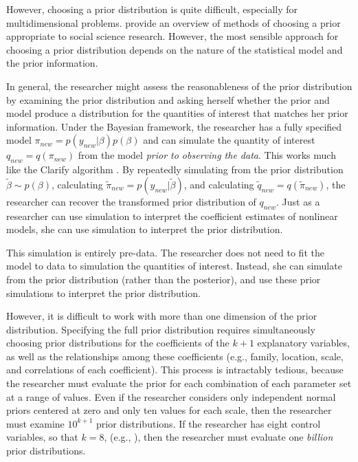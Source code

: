 \documentclass[12pt]{article}
\begin{document}
However, choosing a prior distribution is quite difficult, especially for multidimensional problems. 
\cite{GillWalker2005} provide an overview of methods of choosing a prior appropriate to social science research. 
However, the most sensible approach for choosing a prior distribution depends on the nature of the statistical model and the prior information.

In general, the researcher might assess the reasonableness of the prior distribution by examining the prior distribution and asking herself whether the prior and model produce a distribution for the quantities of interest that matches her prior information. 
Under the Bayesian framework, the researcher has a fully specified model $\pi_{new} = p(y_{new}|\beta)p(\beta)$ and can simulate the quantity of interest $q_{new} = q(\pi_{new})$ from the model \textit{prior to observing the data}. 
This works much like the Clarify algorithm \citep{KingTomzWittenberg2000}.
By repeatedly simulating from the prior distribution $\tilde{\beta} \sim p(\beta)$, calculating $\tilde{\pi}_{new} = p(y_{new}|\tilde{\beta})$, and calculating $\tilde{q}_{new} = q(\tilde{\pi}_{new})$, the researcher can recover the transformed prior distribution of $q_{new}$.
Just as a researcher can use simulation to interpret the coefficient estimates of nonlinear models, she can use simulation to interpret the prior distribution.

This simulation is entirely pre-data. 
The researcher does not need to fit the model to data to simulation the quantities of interest. 
Instead, she can simulate from the prior distribution (rather than the posterior), and use these prior simulations to interpret the prior distribution.

However, it is difficult to work with more than one dimension of the prior distribution. 
Specifying the full prior distribution requires simultaneously choosing prior distributions for the coefficients of the $k + 1$ explanatory variables, as well as the relationships among these coefficients (e.g., family, location, scale, and correlations of each coefficient). 
This process is intractably tedious, because the researcher must evaluate the prior for each combination of each parameter set at a range of values. 
Even if the researcher considers only independent normal priors centered at zero and only ten values for each scale, then the researcher must examine $10^{k+1}$ prior distributions. 
If the researcher has eight control variables, so that $k = 8$, (e.g., \citealt{BarrilleauxRainey2014}), then the researcher must evaluate one \emph{billion} prior distributions.
\end{document}
